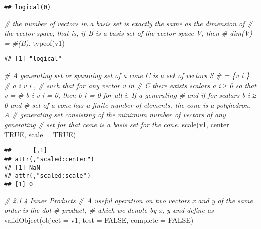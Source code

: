 \documentclass[
]{article}
\newenvironment{Shaded}{\begin{snugshade}}{\end{snugshade}}
\newcommand{\AttributeTok}[1]{\textcolor[rgb]{0.77,0.63,0.00}{#1}}
\newcommand{\CommentTok}[1]{\textcolor[rgb]{0.56,0.35,0.01}{\textit{#1}}}
\newcommand{\ConstantTok}[1]{\textcolor[rgb]{0.00,0.00,0.00}{#1}}
\newcommand{\FunctionTok}[1]{\textcolor[rgb]{0.00,0.00,0.00}{#1}}
\newcommand{\NormalTok}[1]{#1}
\begin{document}
\begin{verbatim}
## logical(0)
\end{verbatim}

\begin{Shaded}
\begin{Highlighting}[]
\CommentTok{\# the number of vectors in a basis set is exactly the same as the dimension of}
\CommentTok{\# the vector space; that is, if B is a basis set of the vector space V, then}
\CommentTok{\# dim(V) = \#(B).}
\FunctionTok{typeof}\NormalTok{(v1)}
\end{Highlighting}
\end{Shaded}

\begin{verbatim}
## [1] "logical"
\end{verbatim}

\begin{Shaded}
\begin{Highlighting}[]
\CommentTok{\# A generating set or spanning set of a cone C is a set of vectors S }
\CommentTok{\# = \{v i \}}
\CommentTok{\# a i v i ,}
\CommentTok{\# such that for any vector v in }
\CommentTok{\# C there exists scalars a i ≥ 0 so that v =}
\CommentTok{\# b i v i = 0, then b i = 0 for all i. If a generating}
\CommentTok{\# and if for scalars b i ≥ 0 and}
\CommentTok{\# set of a cone has a ﬁnite number of elements, the cone is a polyhedron. A}
\CommentTok{\# generating set consisting of the minimum number of vectors of any generating}
\CommentTok{\# set for that cone is a basis set for the cone.}
\FunctionTok{scale}\NormalTok{(v1, }\AttributeTok{center =} \ConstantTok{TRUE}\NormalTok{, }\AttributeTok{scale =} \ConstantTok{TRUE}\NormalTok{)}
\end{Highlighting}
\end{Shaded}

\begin{verbatim}
##      [,1]
## attr(,"scaled:center")
## [1] NaN
## attr(,"scaled:scale")
## [1] 0
\end{verbatim}

\begin{Shaded}
\begin{Highlighting}[]
\CommentTok{\# 2.1.4 Inner Products}
\CommentTok{\# A useful operation on two vectors x and y of the same order is the dot }
\CommentTok{\# product,}
\CommentTok{\# which we denote by x, y and deﬁne as}
\FunctionTok{validObject}\NormalTok{(}\AttributeTok{object =}\NormalTok{ v1, }\AttributeTok{test =} \ConstantTok{FALSE}\NormalTok{, }\AttributeTok{complete =} \ConstantTok{FALSE}\NormalTok{)}
\end{Highlighting}
\end{Shaded}
\end{document}
